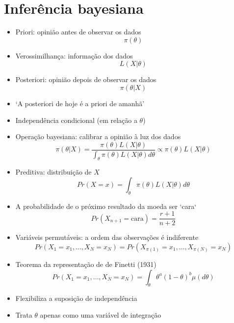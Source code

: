\documentclass{beamer}
\begin{document}
\section{Inferência bayesiana}
\begin{frame}{\secname}
    \begin{itemize}
    \item Priori: opinião antes de observar os dados \[ \pi(\theta) \]
    \pause
    \item Verossimilhança: informação dos dados \[ L(X|\theta) \]
    \pause
    \item Posteriori: opinião depois de observar os dados \[ \pi(\theta|X) \]
    \end{itemize}
\end{frame}

\begin{frame}{\secname}
    \begin{itemize}
    \item `A posteriori de hoje é a priori de amanhã'
    \pause
    \item Independência condicional (em relação a $\theta$)
    \pause
    \item Operação bayesiana: calibrar a opinião à luz dos dados \[ \pi(\theta|X) = \frac{\pi(\theta) L(X|\theta)}{\int_{\theta} \pi(\theta) L(X|\theta) d\theta} \propto \pi(\theta) L(X|\theta) \]
    \pause
    \item Preditiva: distribuição de $X$ \[ Pr(X=x) = \int_{\theta} \pi(\theta) L(X|\theta) d\theta \]
    \pause
    \item A probabilidade de o próximo resultado da moeda ser `cara` \[ Pr(X_{n+1}=\textrm{cara}) = \frac{r+1}{n+2} \]
    \end{itemize}
\end{frame}

\begin{frame}{\secname}
    \begin{itemize}
    \item Variáveis permutáveis: a ordem das observações é indiferente \[ Pr(X_1=x_1, \ldots, X_N=x_N) = Pr(X_{\pi(1)}=x_1, \ldots, X_{\pi(N)}=x_N)  \]
    \pause
    \item Teorema da representação de de Finetti (1931) \[ Pr(X_1=x_1, \ldots, X_N=x_N) = \int_{\theta} \theta^a (1-\theta)^b \mu(d\theta) \]
    \pause
    \item Flexibiliza a suposição de independência
    \pause
    \item Trata $\theta$ apenas como uma variável de integração
    \end{itemize}
\end{frame}
\end{document}
